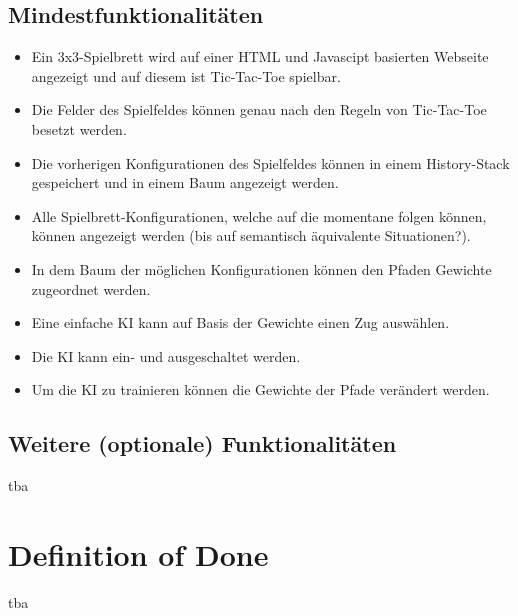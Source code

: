 \documentclass[titlepage]{scrartcl}
\begin{document}
\subsection{Mindestfunktionalitäten}
		\begin{itemize}
			\item Ein 3x3-Spielbrett wird auf einer HTML und Javascipt basierten Webseite angezeigt und auf diesem ist Tic-Tac-Toe spielbar.
			\item Die Felder des Spielfeldes können genau nach den Regeln von Tic-Tac-Toe besetzt werden.
			\item Die vorherigen Konfigurationen des Spielfeldes können in einem History-Stack gespeichert und in einem Baum angezeigt werden.
			\item Alle Spielbrett-Konfigurationen, welche auf die momentane folgen können, können angezeigt werden (bis auf semantisch äquivalente Situationen?).
			\item In dem Baum der möglichen Konfigurationen können den Pfaden Gewichte zugeordnet werden.
			\item Eine einfache KI kann auf Basis der Gewichte einen Zug auswählen.
			\item Die KI kann ein- und ausgeschaltet werden.
			\item Um die KI zu trainieren können die Gewichte der Pfade verändert werden.
		\end{itemize}
\subsection{Weitere (optionale) Funktionalitäten}
	tba
\section{Definition of Done}%
tba
\end{document}
